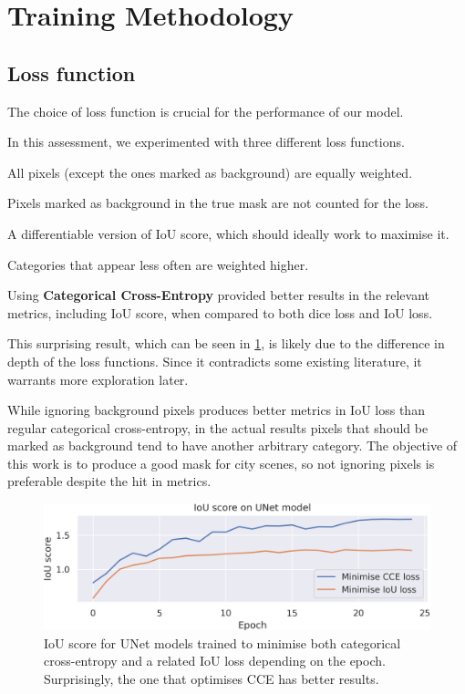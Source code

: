 \newcommand{\lt}{L\textsubscript{2}}

\section{Training Methodology}

\subsection{Loss function}

The choice of loss function is crucial for the performance of our model.

In this assessment, we experimented with three different loss functions.

\begin{description}[style=nextline]
	\item[Categorical Cross-Entropy Loss] All pixels (except the ones marked as background) are equally weighted.
	\item[CCE loss ignoring background pixels] Pixels marked as background in the true mask are not counted for the loss.
	\item[Intersection over Union Loss] A differentiable version of IoU score, which should ideally work to maximise it.
	\item[Dice Loss] Categories that appear less often are weighted higher\cite{dice_loss}.
\end{description}

Using \textbf{Categorical Cross-Entropy} provided better results in the relevant metrics, including IoU score, when compared to both dice loss and IoU loss.

This surprising result, which can be seen in \cref{iou_vs_cce}, is likely due to the difference in depth of the loss functions.
Since it contradicts some existing literature\cite{dice_loss}, it warrants more exploration later.

While ignoring background pixels produces better metrics in IoU loss than regular categorical cross-entropy, in the actual results pixels that should be marked as background tend to have another arbitrary category.
The objective of this work is to produce a good mask for city scenes, so not ignoring pixels is preferable despite the hit in metrics.

\begin{figure}[b]
	\centering
	\includegraphics[width=.90\textwidth]{cce_vs_iou_loss.png}
	\caption{IoU score for UNet models trained to minimise both categorical cross-entropy and a related IoU loss depending on the epoch. Surprisingly, the one that optimises CCE has better results.}
	\label{iou_vs_cce}
\end{figure}

